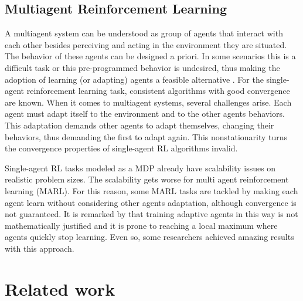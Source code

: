 \documentclass[12pt]{article}
\begin{document}
\subsection{Multiagent Reinforcement Learning}
A multiagent system can be understood as group of agents that interact with each other besides perceiving and acting in the environment they are situated. The behavior of these agents can be designed a priori. In some scenarios this is a difficult task or this pre-programmed behavior is undesired, thus making the adoption of learning (or adapting) agents a feasible alternative \cite{Busoniu+2008}.
For the single-agent reinforcement learning task, consistent algorithms with good convergence are known. When it comes to multiagent systems, several challenges arise. Each agent must adapt itself to the environment and to the other agents behaviors. This adaptation demands other agents to adapt themselves, changing their behaviors, thus demanding the first to adapt again. This nonstationarity turns the convergence properties of single-agent RL algorithms invalid.


Single-agent RL tasks modeled as a MDP already have scalability issues on realistic problem sizes. The scalability gets worse for multi agent reinforcement learning (MARL). For this reason, some MARL tasks are tackled by making each agent learn without considering other agents adaptation, although convergence is not guaranteed. It is remarked by \cite{Littman1994} that training adaptive agents in this way is not mathematically justified and it is prone to reaching a local maximum where agents quickly stop learning. Even so, some researchers achieved amazing results with this approach.

\section{Related work}
\label{sec:related}
\end{document}
